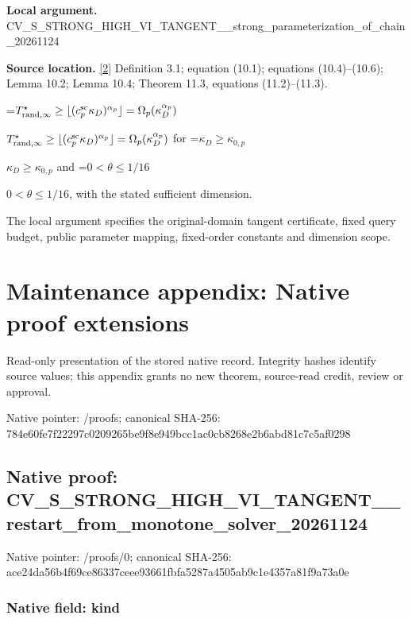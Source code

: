 \documentclass[10pt,a4paper]{article}
\newcommand{\AtlasMath}[1]{\par\begingroup\centering\setbox0=\hbox{$\displaystyle #1$}\ifdim\wd0>1.4\linewidth\typeout{ATLAS WIDE FORMULA: \the\wd0}\fi\ifdim\wd0>\linewidth\resizebox{\linewidth}{!}{\box0}\else\box0\fi\par\endgroup}
\newcommand{\AtlasInlineMath}[1]{\begingroup\setbox0=\hbox{$#1$}\ifdim\wd0>.4\linewidth\endgroup\AtlasMath{#1}\else\endgroup$#1$\fi}
\begin{document}
\textbf{Local argument.} CV\_S\_STRONG\_HIGH\_VI\_TANG\allowbreak{}ENT\_\_strong\_parameteriza\allowbreak{}tion\_of\_chain\_20261124



\textbf{Source location.} \href{https://arxiv.org/pdf/2609.13462v2}{[2]} Definition 3.1; equation (10.1); equations (10.4)--(10.6); Lemma 10.2; Lemma 10.4; Theorem 11.3, equations (11.2)--(11.3).



\AtlasInlineMath{T^\star_{{\rm rand},\infty}\ge\lfloor(c_p^{\rm sc}\kappa_D)^{\alpha_p}\rfloor=\Omega_p(\kappa_D^{\alpha_p})} for \AtlasInlineMath{\kappa_D\ge\kappa_{0,p}} and \AtlasInlineMath{0<\theta\le1/16}, with the stated sufficient dimension.



The local argument specifies the original-domain tangent certificate, fixed query budget, public parameter mapping, fixed-order constants and dimension scope.



\section{Maintenance appendix: Native proof extensions}


Read-only presentation of the stored native record. Integrity hashes identify source values; this appendix grants no new theorem, source-read credit, review or approval.



Native pointer: /proofs; canonical SHA-256: 784e60fe7f22297c0209265b\allowbreak{}e9f8e949bcc1ac0cb8268e2b\allowbreak{}6abd81c7c5af0298



\subsection{Native proof: CV\_S\_STRONG\_HIGH\_VI\_TANG\allowbreak{}ENT\_\_restart\_from\_monoto\allowbreak{}ne\_solver\_20261124}


Native pointer: /proofs/0; canonical SHA-256: ace24da56b4f69ce86337cee\allowbreak{}e93661fbfa5287a4505ab9c1\allowbreak{}e4357a81f9a73a0e



\subsubsection{Native field: kind}
\end{document}
